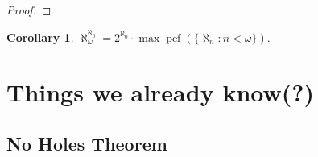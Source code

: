 \documentclass[10pt]{amsart}
\theoremstyle{plain}
\theoremstyle{definition}
\newtheorem{corollary}[proposition]{Corollary}
\theoremstyle{remark}
\DeclareMathOperator{\pcf}{pcf}
\numberwithin{equation}{section}
\begin{document}
\begin{proof}
\end{proof}





\begin{corollary}
$\aleph_\omega^{\aleph_0}= 2^{\aleph_0}\cdot \max\pcf(\{\aleph_n:n<\omega\})$.
\end{corollary}


\section{Things we already know(?)}

\subsection{No Holes Theorem}
\end{document}
